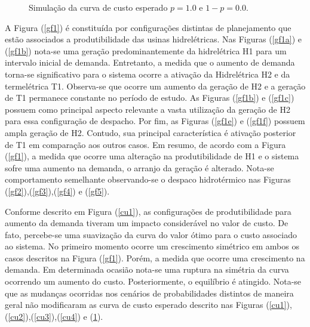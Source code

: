 \begin{figure}[!ht]
	\centering
	\caption{Simula\c c\~ao da curva de custo esperado $p = 1.0$ e $1 - p = 0.0$.}
	\label{cu5}
\end{figure}
\clearpage
A Figura (\ref{gf1}) \'e constitu\'ida por configura\c c\~oes distintas de planejamento que est\~ao associados a produtibilidade das usinas
hidrel\'etricas. Nas Figuras (\ref{gf1a}) e (\ref{gf1b}) nota-se uma gera\c c\~ao predominantemente da hidrel\'etrica H1
para um intervalo inicial de demanda.
Entretanto, a medida que o aumento de demanda torna-se significativo para o sistema ocorre a ativa\c c\~ao da Hidrel\'etrica H2
e da termel\'etrica T1. Observa-se que ocorre um aumento da gera\c c\~ao de H2 e a gera\c c\~ao de T1 permanece constante no per\'iodo de estudo.
As Figuras (\ref{gf1b}) e (\ref{gf1c}) possuem como principal aspecto relevante a vasta utiliza\c c\~ao
da gera\c c\~ao de H2 para essa configura\c c\~ao de despacho. Por fim, as Figuras (\ref{gf1e}) e (\ref{gf1f}) possuem ampla gera\c c\~ao de H2.
Contudo, sua principal caracter\'istica \'e ativa\c c\~ao posterior de T1 em compara\c c\~ao aos outros casos.
Em resumo, de acordo com a Figura (\ref{gf1}), a medida que ocorre uma altera\c c\~ao na produtibilidade de H1
e o sistema sofre uma aumento na demanda, o arranjo da gera\c c\~ao \'e alterado. Nota-se comportamento semelhante
observando-se o despaco hidrot\'ermico nas Figuras (\ref{gf2}),(\ref{gf3}),(\ref{gf4}) e (\ref{gf5}). 

Conforme descrito em Figura (\ref{cu1}), as configura\c c\~oes de produtibilidade para aumento da demanda tiveram um
impacto consider\'avel no valor de custo. De fato, percebe-se uma suaviza\c c\~ao da curva do valor \'otimo para o custo
associado ao sistema. No primeiro momento ocorre um crescimento sim\'etrico em ambos os casos descritos na Figura
(\ref{gf1}). Por\'em, a medida que ocorre uma crescimento na demanda. Em determinada ocasi\~ao nota-se uma ruptura na
sim\'etria da curva ocorrendo um aumento do custo. Posteriormente, o equil\'ibrio \'e atingido. Nota-se que as mudan\c
cas ocorridas nos cen\'arios de probabilidades distintos de maneira geral n\~ao modificaram as curva de custo esperado
descrito nas Figuras (\ref{cu1}),(\ref{cu2}),(\ref{cu3}),(\ref{cu4}) e (\ref{cu5}).

